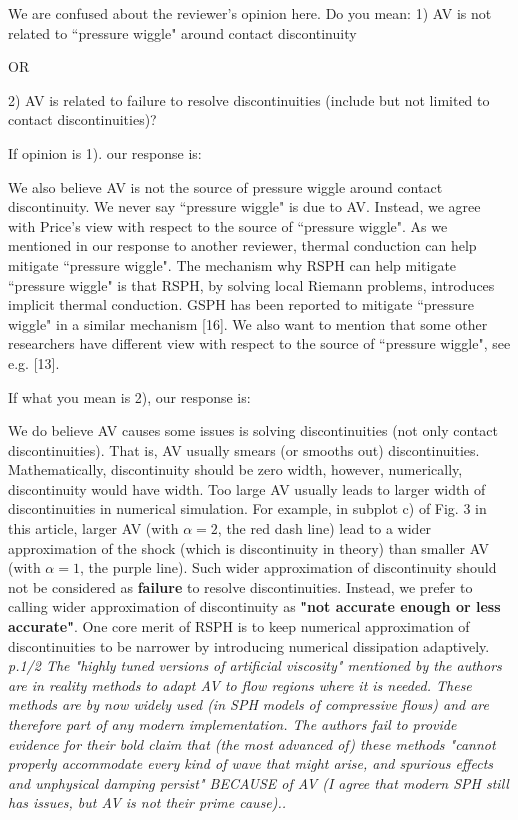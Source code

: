 \documentclass[10pt,a4paper]{article}
\begin{document}
We are confused about the reviewer's opinion here.
Do you mean: 
1) AV is not related to ``pressure wiggle" around contact discontinuity

OR
 
2) AV is related to failure to resolve discontinuities (include but not limited to contact discontinuities)? 

If opinion is 1). our response is: 

We also believe AV is not the source of pressure wiggle around contact discontinuity.
We never say ``pressure wiggle" is due to AV. Instead, we agree with Price's view with respect to the source of ``pressure wiggle". As we mentioned in our response to another reviewer, thermal conduction can help mitigate ``pressure wiggle". The mechanism why RSPH can help mitigate ``pressure wiggle" is that RSPH, by solving local Riemann problems, introduces implicit thermal conduction. GSPH has been reported to mitigate ``pressure wiggle" in a similar mechanism [16]. We also want to mention that some other researchers have different view with respect to the source of ``pressure wiggle", see e.g. [13].

If what you mean is 2), our response is:

We do believe AV causes some issues is solving discontinuities (not only contact discontinuities). That is, AV usually smears (or smooths out) discontinuities. Mathematically, discontinuity should be zero width, however, numerically, discontinuity would have width. Too large AV usually leads to larger width of discontinuities in numerical simulation. For example, in subplot c) of Fig. 3 in this article, larger AV (with $\alpha = 2$, the red dash line) lead to a wider approximation of the shock (which is discontinuity in theory) than smaller AV (with $\alpha = 1$, the purple line). 
Such wider approximation of discontinuity should not be considered as \textbf{failure} to resolve discontinuities. Instead, we prefer to calling wider approximation of discontinuity as \textbf{"not accurate enough or less accurate"}. One core merit of RSPH is to keep numerical approximation of discontinuities to be narrower by introducing numerical dissipation adaptively.
\\[3pt]
 
\textit{p.1/2 The "highly tuned versions of artificial viscosity" mentioned by the authors are in reality methods to adapt AV to flow regions where it is needed. These methods are by now widely used (in SPH models of compressive flows) and are therefore part of any modern implementation.
The authors fail to provide evidence for their bold claim that (the most advanced of) these methods "cannot properly accommodate every kind of wave that might arise, and spurious effects and unphysical damping persist" BECAUSE of AV (I agree that modern SPH still has issues, but AV is not their prime cause)..}
\end{document}
